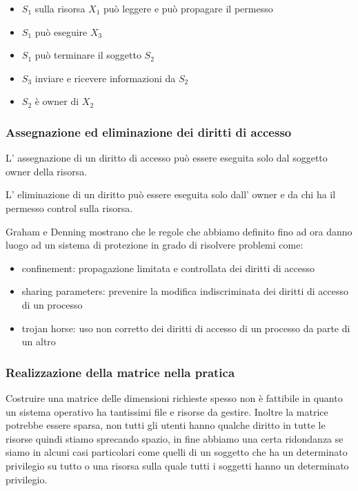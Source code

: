 \begin{itemize}
    \item $S_1$ sulla risorsa $X_1$ può leggere e può propagare il permesso
    \item $S_1$ può eseguire $X_3$
    \item $S_1$ può terminare il soggetto $S_2$
    \item $S_3$ inviare e ricevere informazioni da $S_2$
    \item $S_2$ è owner di $X_2$
\end{itemize}

\subsubsection{Assegnazione ed eliminazione dei diritti di accesso}
L' assegnazione di un diritto di accesso può essere eseguita solo dal soggetto owner della risorsa.

L' eliminazione di un diritto può essere eseguita solo dall' owner e da chi ha il permesso control sulla risorsa.

Graham e Denning mostrano che le regole che abbiamo definito fino ad ora danno luogo ad un sistema di protezione in grado di risolvere problemi come:
\begin{itemize}
    \item confinement: propagazione limitata e controllata dei diritti di accesso

    \item sharing parameters: prevenire la modifica indiscriminata dei diritti di accesso di un processo

    \item trojan horse: uso non corretto dei diritti di accesso di un processo da parte di un altro
\end{itemize}

\subsubsection{Realizzazione della matrice nella pratica}
Costruire una matrice delle dimensioni richieste spesso non è fattibile in quanto un sistema operativo ha tantissimi file e risorse da gestire.
Inoltre la matrice potrebbe essere sparsa, non tutti gli utenti hanno qualche diritto in tutte le risorse quindi stiamo sprecando spazio, in fine abbiamo una certa ridondanza se siamo in alcuni casi particolari come quelli di un soggetto che ha un determinato privilegio su tutto o una risorsa sulla quale tutti i soggetti hanno un determinato privilegio.


